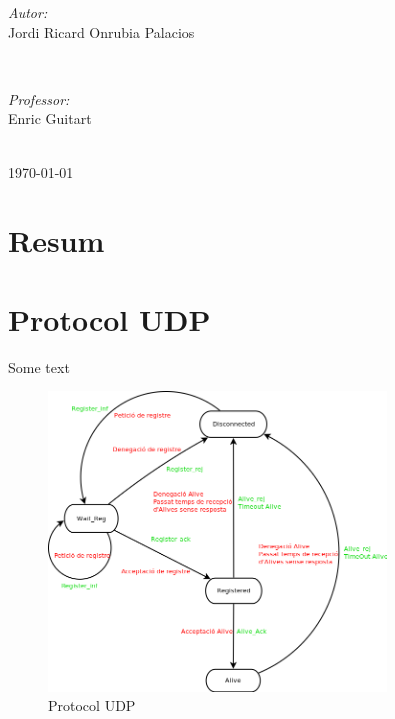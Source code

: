 \documentclass[11pt]{article}
\begin{document}
\begin{titlepage}
\begin{minipage}{0.4\textwidth}
\begin{flushleft} \large
\emph{Autor:}\\
Jordi Ricard Onrubia Palacios %
\end{flushleft}
\end{minipage}
~
\begin{minipage}{0.4\textwidth}
\begin{flushright} \large
\emph{Professor:} \\
Enric Guitart %
\end{flushright}
\end{minipage}\\[4cm]

{\large \today}\\[3cm] %
\vfill %
\end{titlepage}

\newpage
\section*{Resum}
\justify
\thispagestyle{empty}
\newpage
\thispagestyle{empty}
\tableofcontents
\newpage
\clearpage
{}
\section{Protocol UDP}
Some text
\begin{figure}[h]
    \centering
    \includegraphics[width=0.8\textwidth]{UDP_diagram.png}
    \caption{Protocol UDP}
    \label{fig:ProtcolUDP}
\end{figure}
\end{document}
